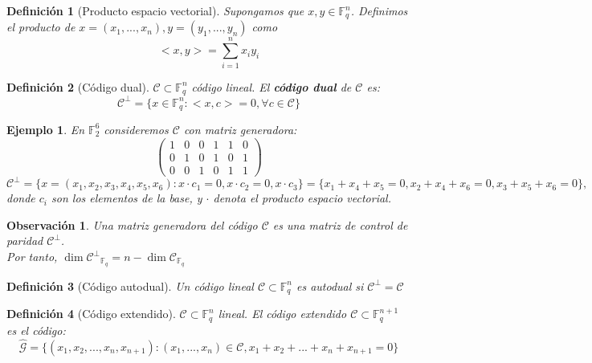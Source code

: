 \documentclass[spanish]{book}
\newtheorem{mydef}{Definición}
\newtheorem{ejem}{Ejemplo}
\newtheorem{obsv}{Observación}
\begin{document}
\begin{mydef}[Producto espacio vectorial]
	Supongamos que $x, y \in \mathbb{F}_q^n$. Definimos el producto de $x=(x_1, ..., x_n), y=(y_1, ..., y_n)$ como 
	$$ <x, y> = \sum_{i=1}^{n} x_i y_i $$
\end{mydef}

\begin{mydef}[Código dual]
	$\mathcal{C} \subset \mathbb{F}_q^n$ código lineal. El \textbf{código dual} de $\mathcal{C}$ es:
	$$ \mathcal{C}^\bot=\{x \in \mathbb{F}_q^n : <x, c> = 0, \forall c \in \mathcal{C} \}$$
\end{mydef}

\begin{ejem}
	En $\mathbb{F}_2^6$ consideremos $\mathcal{C}$ con matriz generadora:
	$$\left(
	\begin{array}{cccccc}
	1 & 0 & 0 & 1 & 1 & 0 \\
	0 & 1 & 0 & 1 & 0 & 1 \\
	0 & 0 & 1 & 0 & 1 & 1
	\end{array} \right)
	$$
	$$\mathcal{C}^\bot=\{x=(x_1, x_2, x_3, x_4, x_5, x_6): x \cdot c_1=0, x \cdot c_2 = 0, x \cdot c_3 \}=\{x_1+x_4+x_5=0, x_2+x_4+x_6=0, x_3+x_5+x_6=0\},$$
	donde $c_i$ son los elementos de la base, y $\cdot$ denota el producto espacio vectorial.
\end{ejem}

\begin{obsv}
	Una matriz generadora del código $\mathcal{C}$ es una matriz de control de paridad  $\mathcal{C}^\bot$. \\
	Por tanto, $\dim{\mathcal{C}^\bot}_{\mathbb{F}_q}=n-\dim{\mathcal{C}}_{\mathbb{F}_q}$
\end{obsv}

\begin{mydef}[Código autodual]
	Un código lineal $\mathcal{C} \subset \mathbb{F}_q^n$ es autodual si $\mathcal{C}^\bot = \mathcal{C}$
\end{mydef}


\begin{mydef}[Código extendido]
	$\mathcal{C} \subset \mathbb{F}_q^n$ lineal. El código extendido $\mathcal{C} \subset \mathbb{F}_q^{n+1}$ es el código:
	$$ \hat{\mathcal{G}}=\{ (x_1, x_2, ..., x_n, x_{n+1}) : (x_1, ..., x_n) \in \mathcal{C}, x_1+x_2+...+x_n+x_{n+1}=0 \}$$
\end{mydef}
\end{document}
